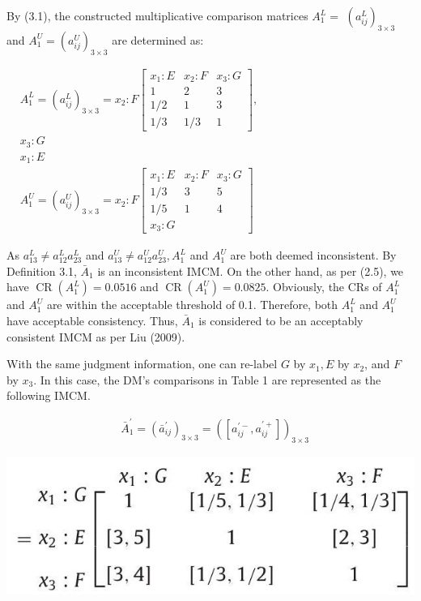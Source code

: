 \documentclass[10pt]{article}
\begin{document}
By (3.1), the constructed multiplicative comparison matrices $A_{1}^{L}=$ $\left(a_{i j}^{L}\right)_{3 \times 3}$ and $A_{1}^{U}=\left(a_{i j}^{U}\right)_{3 \times 3}$ are determined as:

$\begin{aligned} & A_{1}^{L}=\left(a_{i j}^{L}\right)_{3 \times 3}= x_{2}: F\left[\begin{array}{ccr}x_{1}: E & x_{2}: F & x_{3}: G \\ 1 & 2 & 3 \\ 1 / 2 & 1 & 3 \\ 1 / 3 & 1 / 3 & 1\end{array}\right], \\ & x_{3}: G \\ & x_{1}: E \\ & A_{1}^{U}=\left(a_{i j}^{U}\right)_{3 \times 3}= x_{2}: F\left[\begin{array}{ccr}x_{1}: E & x_{2}: F & x_{3}: G \\ 1 / 3 & 3 & 5 \\ 1 / 5 & 1 & 4 \\ x_{3}: G\end{array}\right]\end{aligned}$

As $a_{13}^{L} \neq a_{12}^{L} a_{23}^{L}$ and $a_{13}^{U} \neq a_{12}^{U} a_{23}^{U}, A_{1}^{L}$ and $A_{1}^{U}$ are both deemed inconsistent. By Definition 3.1, $\bar{A}_{1}$ is an inconsistent IMCM. On the other hand, as per (2.5), we have $\operatorname{CR}\left(A_{1}^{L}\right)=0.0516$ and $\operatorname{CR}\left(A_{1}^{U}\right)=0.0825$. Obviously, the CRs of $A_{1}^{L}$ and $A_{1}^{U}$ are within the acceptable threshold of 0.1. Therefore, both $A_{1}^{L}$ and $A_{1}^{U}$ have acceptable consistency. Thus, $\bar{A}_{1}$ is considered to be an acceptably consistent IMCM as per Liu (2009).

With the same judgment information, one can re-label $G$ by $x_{1}, E$ by $x_{2}$, and $F$ by $x_{3}$. In this case, the DM's comparisons in Table 1 are represented as the following IMCM.

$$
\begin{aligned}
& \bar{A}_{1}^{\prime}=\left(\bar{a}_{i j}^{\prime}\right)_{3 \times 3}=\left(\left[a_{i j}^{\prime-}, a_{i j}^{\prime+}\right]\right)_{3 \times 3}
\end{aligned}
$$

\begin{center}
\includegraphics[max width=\textwidth]{2024_01_11_2cd5b15325412bfb985dg-03(1)}
\end{center}
\end{document}
